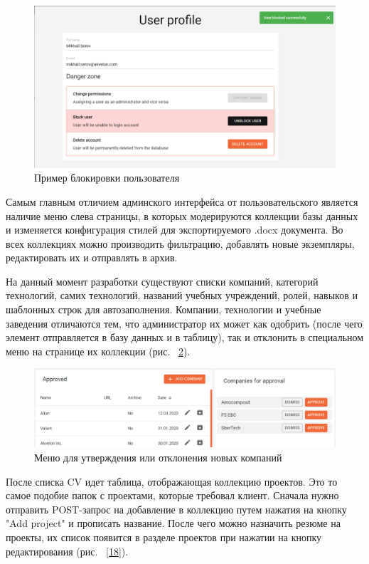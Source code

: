 \documentclass[12pt, a4paper]{diplom}
\begin{document}
\begin{figure}[!ht]
\centering
\includegraphics[width=1\textwidth]{resources/dangerzone.png}
\caption{Пример блокировки пользователя}
\label{16}
\end{figure}

Самым главным отличием админского интерфейса от пользовательского является наличие меню слева страницы, в которых модерируются коллекции базы данных и изменяется конфигурация стилей для экспортируемого .docx документа. Во всех коллекциях можно производить фильтрацию, добавлять новые экземпляры, редактировать их и отправлять в архив.

На данный момент разработки существуют списки компаний, категорий технологий, самих технологий, названий учебных учреждений, ролей, навыков и шаблонных строк для автозаполнения. Компании, технологии и учебные заведения отличаются тем, что администратор их может как одобрить (после чего элемент отправляется в базу данных и в таблицу), так и отклонить в
специальном меню на странице их коллекции (рис. ~\ref{17}).

\begin{figure}[!ht]
\centering
\includegraphics[width=1\textwidth]{resources/companies.png}
\caption{Меню для утверждения или отклонения новых компаний}
\label{17}
\end{figure}
После списка CV идет таблица, отображающая коллекцию проектов. Это то самое подобие папок с проектами, которые требовал клиент. Сначала нужно отправить POST-запрос на добавление в коллекцию
путем нажатия на кнопку "Add project" и прописать название. После чего можно назначить резюме на проекты, их список появится в разделе проектов при нажатии на кнопку редактирования (рис. ~\ref{18}).
\end{document}
